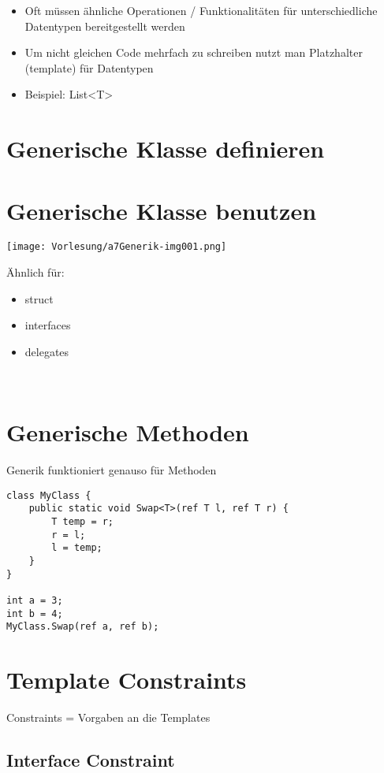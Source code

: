 \begin{itemize}
\item Oft müssen ähnliche Operationen / Funktionalitäten für unterschiedliche Datentypen bereitgestellt werden
\item Um nicht gleichen Code mehrfach zu schreiben nutzt man Platzhalter (template) für Datentypen
\item Beispiel: List<T>
\end{itemize}

\section{Generische Klasse definieren}

\section{Generische Klasse benutzen}

\begin{center}
\texttt{[image: Vorlesung/a7Generik-img001.png]}
\end{center}

Ähnlich für: 
\begin{itemize}
\item struct 
\item interfaces
\item delegates
\end{itemize}
~

\section{Generische Methoden}
Generik funktioniert genauso für Methoden
\begin{lstlisting}[language={[Sharp]C}]
class MyClass {
	public static void Swap<T>(ref T l, ref T r) { 
		T temp = r;
		r = l;
		l = temp;   
	}
}

int a = 3;
int b = 4;
MyClass.Swap(ref a, ref b);
\end{lstlisting}

\section{Template Constraints}
Constraints = Vorgaben an die Templates

\subsection{Interface Constraint}

